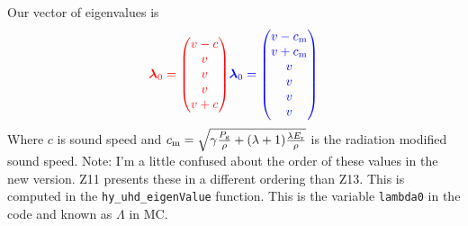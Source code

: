 \documentclass[preprint,11pt]{aastex}
\newcommand{\beq}{\begin{equation}}
\newcommand{\eeq}{\end{equation}}
\begin{document}
Our vector of eigenvalues is
\beq
{\color{red}\boldsymbol{\lambda}_0 = \begin{pmatrix}v - c\\v \\ v \\ v \\ v + c\end{pmatrix}}{\color{blue}\boldsymbol{\lambda}_0 = \begin{pmatrix}v - c_{\rm m}\\v + c_{\rm m} \\v \\ v \\ v \\ v \end{pmatrix}}
\eeq
Where $c$ is sound speed and $c_{\rm m}=\sqrt{\gamma \frac{P_{\rm g}}{\rho} + (\lambda + 1)\frac{\lambda E_{\rm r}}{\rho}}$ is the radiation modified sound speed.  {\color{blue}Note: I'm a little confused about the order of these values in the new version.  Z11 presents these in a different ordering than Z13.}  This is computed in the \verb!hy_uhd_eigenValue! function.  This is the variable \verb!lambda0! in the code and known as $\Lambda$ in MC.
\end{document}
